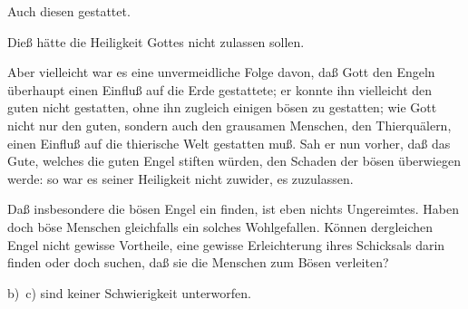 \begin{aufza}
\begin{aufzb}
\end{aufzb}
\item Auch diesen  gestattet.\par
{} Dieß hätte die Heiligkeit Gottes nicht zulassen sollen.~\par
{} Aber vielleicht war es eine unvermeidliche Folge davon, daß Gott den Engeln überhaupt einen Einfluß auf die Erde gestattete; er konnte ihn vielleicht den guten nicht gestatten, ohne ihn zugleich einigen bösen zu gestatten; wie Gott nicht nur den guten, sondern auch den grausamen Menschen, den Thierquälern, einen Einfluß auf die thierische Welt gestatten muß. Sah er nun vorher, daß das Gute, welches die guten Engel stiften würden, den Schaden der bösen überwiegen werde: so war es seiner Heiligkeit nicht zuwider, es zuzulassen.
\begin{aufzb}
\item Daß insbesondere die bösen Engel ein  finden, ist eben nichts Ungereimtes. Haben doch böse Menschen gleichfalls ein solches Wohlgefallen. Können dergleichen Engel nicht gewisse Vortheile, eine gewisse Erleichterung ihres Schicksals darin finden oder doch suchen, daß sie die Menschen zum Bösen verleiten?
\item[b)\ c)] sind keiner Schwierigkeit unterworfen.
\end{aufzb}
\end{aufza}

